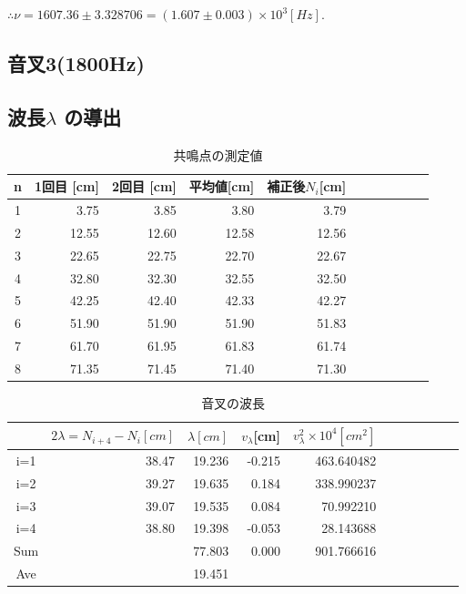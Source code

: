 \documentclass[a4paper,1pt]{jsarticle}
\begin{document}
$\therefore \nu =1607.36\pm3.328706=(1.607\pm0.003)\times10^3[Hz].$





\subsection[3]{音叉3(1800Hz)}

\subsection*{波長$\lambda$ の導出}

\begin{table}[H]
  \caption{共鳴点の測定値}
  \label{table:SpeedOfLight}
  \centering
  \begin{tabular}{|c||r|r|r|r|r|r|r|r|r|r|}
    \hline
    n & 1回目 [cm]& 2回目 [cm]& 平均値[cm] & 補正後$N_i$[cm] \\
    \hline\hline
    
    1 & 3.75 & 3.85 & 3.80 & 3.79 \\
    2 & 12.55 & 12.60 & 12.58 & 12.56 \\
    3 & 22.65 & 22.75 & 22.70 & 22.67 \\
    4 & 32.80 & 32.30 & 32.55 & 32.50 \\
    5 & 42.25 & 42.40 & 42.33 & 42.27 \\
    6 & 51.90 & 51.90 & 51.90 & 51.83 \\
    7 & 61.70 & 61.95 & 61.83 & 61.74 \\
    8 & 71.35 & 71.45 & 71.40 & 71.30 \\
    
    
    

    \hline
  \end{tabular}


\end{table}


\begin{table}[H]
  \caption{音叉の波長}
  \label{table:SpeedOfLight}
  \centering
  \begin{tabular}{|c||r|r|r|r|r|r|r|r|r|r|}
    \hline
    & $2\lambda =N_{i+4}-N_{i} [cm]$ & $\lambda [cm]$ & $v_\lambda $[cm]&  $v_\lambda ^2\times 10^4[cm^2]$\\
    \hline\hline
    
   
    i=1 &38.47 & 19.236 & -0.215 & 463.640482 \\
    i=2 &39.27 & 19.635 & 0.184 & 338.990237 \\
    i=3 &39.07 & 19.535 & 0.084 & 70.992210 \\
    i=4 &38.80 & 19.398 & -0.053 & 28.143688 \\
    
    
    
    

    \hline\hline

    Sum &&77.803 & 0.000 & 901.766616 \\
    \hline
    Ave & &19.451 &  &  \\
    \hline
  \end{tabular}


\end{table}
\end{document}
